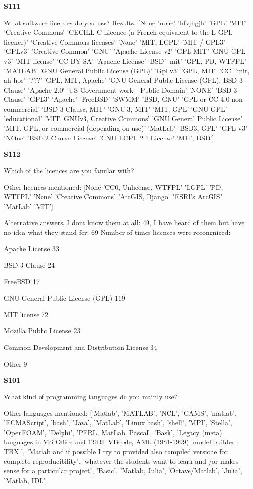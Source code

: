 \textbf{S111}

What software licences do you use? Results: [None 'none' 'hfvjhgjh' 'GPL' 'MIT' 'Creative Commons'
 'CECILL-C Licence (a French equivalent to the L-GPL licence)'
 'Creative Commons licenses' 'None' 'MIT, LGPL' 'MIT / GPL3' 'GPLv3'
 'Creative Common' 'GNU' 'Apache License v2' 'GPL MIT' 'GNU GPL v3'
 'MIT license' 'CC BY-SA' 'Apache License' 'BSD' 'mit' 'GPL, PD, WTFPL'
 'MATLAB' 'GNU General Public License (GPL)' 'Gpl v3' 'GPL, MIT' 'CC'
 'mit, ah hoc' '???' 'GPL, MIT, Apache'
 'GNU General Public License (GPL), BSD 3-Clause' 'Apache 2.0'
 'US Government work - Public Domain' 'NONE' 'BSD 3-Clause' 'GPL3'
 'Apache' 'FreeBSD' 'SWMM' 'BSD, GNU' 'GPL or CC-4.0 non-commercial'
 'BSD 3-Clause, MIT' 'GNU 3, MIT' 'MIT, GPL' 'GNU GPL' 'educational'
 'MIT, GNUv3, Creative Commons' 'GNU General Public License'
 'MIT, GPL, or commercial (depending on use)' 'MatLab' 'BSD3, GPL'
 'GPL v3' 'NOne' 'BSD-2-Clause License' 'GNU LGPL-2.1 License' 'MIT, BSD'] 

\textbf{S112}

Which of the licences are you familar with?

Other licences mentioned: [None 'CC0, Unlicense, WTFPL' 'LGPL' 'PD, WTFPL' 'None' 'Creative Commons'
 'ArcGIS, Django' "ESRI's ArcGIS" 'MatLab' 'MIT']

Alternative answers. I dont know them at all: 49, I have heard of them but have no idea what they stand for: 69
Number of times licences were recongnized: 

 Apache License 33

 BSD 3-Clause 24

 FreeBSD 17

 GNU General Public License (GPL) 119

 MIT license 72

 Mozilla Public License 23

 Common Development and Distribution License 34

 Other 9

\textbf{S101}

What kind of programming languages do you mainly use? 

Other languages mentioned: ['Matlab', 'MATLAB', 'NCL', 'GAMS', 'matlab', 'ECMAScript', 'bash', 'Java', 'MatLab', 'Linux bash', 'shell', 'MPI', 'Stella', 'OpenFOAM', 'Delphi', 'PERL, MatLab, Pascal', 'Bash', 'Legacy (meta) languages in MS Office and ESRI: VBcode, AML (1981-1999), model builder. TBX ', 'Matlab and if possible I try to provided also compiled versione for complete reproducibility', 'whatever the students want to learn and /or makes sense for a particular project', 'Basic', 'Matlab, Julia', 'Octave/Matlab', 'Julia', 'Matlab, IDL']

